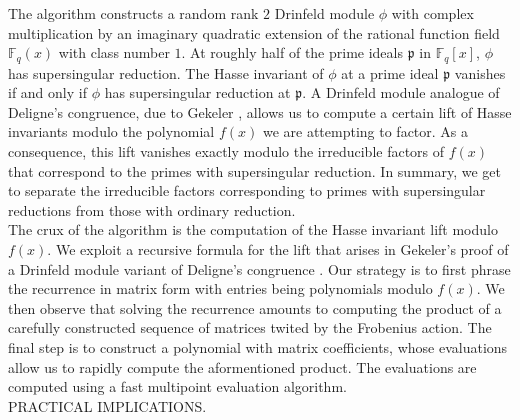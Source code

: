\documentclass{article}
\theoremstyle{plain}
\theoremstyle{definition}
\def\F{\ensuremath{\mathbb{F}}}
\newcommand{\p}{\mathfrak p}
\begin{document}
\noindent The algorithm constructs a random rank $2$ Drinfeld module $\phi$ with complex multiplication by an imaginary quadratic extension of the rational function field $\F_q(x)$  with class number $1$. At roughly half of the prime ideals $\p$ in $\F_q[x]$, $\phi$ has supersingular reduction. The Hasse invariant of $\phi$ at a prime ideal $\p$ vanishes if and only if $\phi$ has supersingular reduction at $\p$. A Drinfeld module analogue of Deligne's congruence, due to Gekeler \cite{gek}, allows us to compute a certain lift of Hasse invariants modulo the polynomial $f(x)$ we are attempting to factor. As a consequence, this lift vanishes exactly modulo the irreducible factors of $f(x)$ that correspond to the primes with supersingular reduction. In summary, we get to separate the irreducible factors corresponding to primes with supersingular reductions from those with ordinary reduction.\\


\noindent The crux of the algorithm is the computation of the Hasse invariant lift modulo $f(x)$. We exploit a recursive formula for the lift that arises in Gekeler's proof of a Drinfeld module variant of Deligne's congruence \cite{gek}. Our strategy is to first phrase the recurrence in matrix form with entries being polynomials modulo $f(x)$. We then observe that solving the recurrence amounts to computing the product of a carefully constructed sequence of matrices twited by the Frobenius action. The final step is to construct a polynomial with matrix coefficients, whose evaluations allow us to rapidly compute the aformentioned product. The evaluations are computed using a fast multipoint evaluation algorithm.\\

\noindent PRACTICAL IMPLICATIONS.\\ \\
\end{document}
